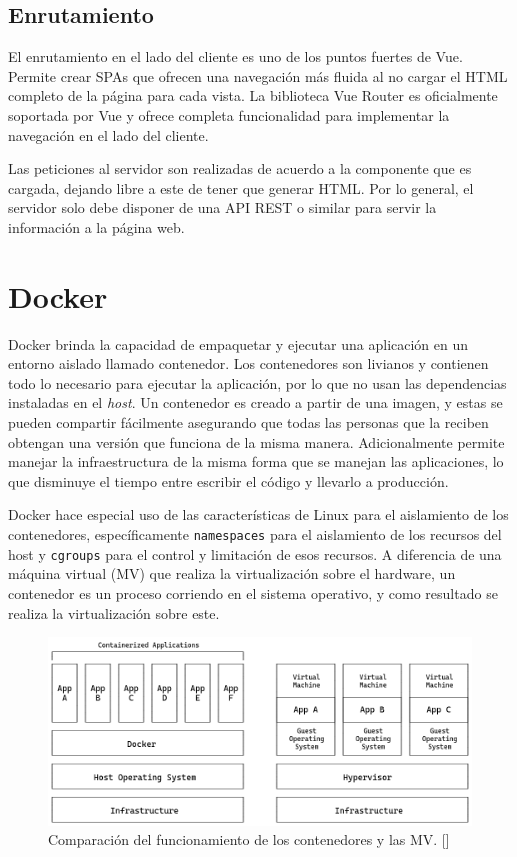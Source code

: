 \subsection{Enrutamiento} 

El enrutamiento en el lado del cliente es uno de los puntos fuertes de Vue. Permite crear SPAs que ofrecen una navegación más fluida al no cargar el HTML completo de la página para cada vista. La biblioteca Vue Router es oficialmente soportada por Vue y ofrece completa funcionalidad para implementar la navegación en el lado del cliente.

Las peticiones al servidor son realizadas de acuerdo a la componente que es cargada, dejando libre a este de tener que generar HTML. Por lo general, el servidor solo debe disponer de una API REST o similar para servir la información a la página web.

\section{Docker}

Docker brinda la capacidad de empaquetar y ejecutar una aplicación en un entorno aislado llamado contenedor. Los contenedores son livianos y contienen todo lo necesario para ejecutar la aplicación, por lo que no usan las dependencias instaladas en el \textit{host}. Un contenedor es creado a partir de una imagen, y estas se pueden compartir fácilmente asegurando que todas las personas que la reciben obtengan una versión que funciona de la misma manera. Adicionalmente permite manejar la infraestructura de la misma forma que se manejan las aplicaciones, lo que disminuye el tiempo entre escribir el código y llevarlo a producción.

Docker hace especial uso de las características de Linux para el aislamiento de los contenedores, específicamente \verb|namespaces| para el aislamiento de los recursos del host y \verb|cgroups| para el control y limitación de esos recursos. A diferencia de una máquina virtual (MV) que realiza la virtualización sobre el hardware, un contenedor es un proceso corriendo en el sistema operativo, y como resultado se realiza la virtualización sobre este.

\begin{figure}[!ht]
    \centering
    \includegraphics[width=\linewidth]{draws/cont-vs-vm.png}
    \caption{Comparación del funcionamiento de los contenedores y las MV. [\cite{docker-containers}]}
\end{figure}


